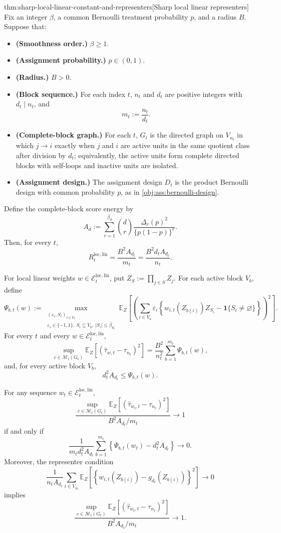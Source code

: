 \begin{theoremv}{thm:sharp-local-linear-constant-and-representers}[Sharp local linear representers]
Fix an integer \(\beta\), a common Bernoulli treatment probability \(p\), and a radius \(B\).  Suppose that:
\begin{itemize}
\item \textbf{(Smoothness order.)} \(\beta\ge 1\).
\item \textbf{(Assignment probability.)} \(p\in(0,1)\).
\item \textbf{(Radius.)} \(B>0\).
\item \textbf{(Block sequence.)} For each index \(t\), \(n_t\) and \(d_t\) are positive integers with \(d_t\mid n_t\), and
\[
m_t:=\frac{n_t}{d_t}.
\]
\item \textbf{(Complete-block graph.)} For each \(t\), \(G_t\) is the directed graph on \(V_{n_t}\) in which \(j\to i\) exactly when \(j\) and \(i\) are active units in the same quotient class after division by \(d_t\); equivalently, the active units form complete directed blocks with self-loops and inactive units are isolated.
\item \textbf{(Assignment design.)} The assignment design \(D_t\) is the product Bernoulli design with common probability \(p\), as in \cref{obj:ass:bernoulli-design}.
\end{itemize}
Define the complete-block score energy by
\[
A_d
:=
\sum_{r=1}^{\bar\beta_d}
\binom{d}{r}\frac{\Delta_r(p)^2}{\{p(1-p)\}^r}.
\]
Then, for every \(t\),
\[
R_t^{\mathrm{loc,lin}}
=
\frac{B^2A_{d_t}}{m_t}
=
\frac{B^2d_tA_{d_t}}{n_t}.
\]

For local linear weights \(w\in\mathcal E_t^{\mathrm{loc,lin}}\), put \(Z_S:=\prod_{j\in S}Z_j\).  For each active block \(V_b\), define
\[
\Psi_{b,t}(w)
:=
\max_{\substack{(\varepsilon_i,S_i)_{i\in V_b}\\
\varepsilon_i\in\{-1,1\},\ S_i\subseteq V_b,\ |S_i|\le \bar\beta_{d_t}}}
\mathbb E_Z\!\left[
\left(
\sum_{i\in V_b}
\varepsilon_i
\left\{
w_{i,t}(Z_{b(i)})Z_{S_i}
-
\mathbf 1\{S_i\ne\varnothing\}
\right\}
\right)^2
\right].
\]
For every \(t\) and every \(w\in\mathcal E_t^{\mathrm{loc,lin}}\),
\[
\sup_{c\in\mathcal M_t(G_t)}
\mathbb E_Z\!\left[(\widehat\tau_{w,t}-\tau_{n_t})^2\right]
=
\frac{B^2}{n_t^2}\sum_{b=1}^{m_t}\Psi_{b,t}(w),
\]
and, for every active block \(V_b\),
\[
d_t^2A_{d_t}\le \Psi_{b,t}(w).
\]

For any sequence \(w_t\in\mathcal E_t^{\mathrm{loc,lin}}\),
\[
\frac{
\sup_{c\in\mathcal M_t(G_t)}
\mathbb E_Z\!\left[(\widehat\tau_{w_t,t}-\tau_{n_t})^2\right]
}{
B^2A_{d_t}/m_t
}
\longrightarrow 1
\]
if and only if
\[
\frac{1}{m_td_t^2A_{d_t}}
\sum_{b=1}^{m_t}
\left\{\Psi_{b,t}(w_t)-d_t^2A_{d_t}\right\}
\longrightarrow 0.
\]
Moreover, the representer condition
\[
\frac{1}{n_tA_{d_t}}
\sum_{i\in V_{n_t}}
\mathbb E_Z\!\left[
\left\{
w_{i,t}(Z_{b(i)})-g_{d_t}(Z_{b(i)})
\right\}^2
\right]
\longrightarrow 0
\]
implies
\[
\frac{
\sup_{c\in\mathcal M_t(G_t)}
\mathbb E_Z\!\left[(\widehat\tau_{w_t,t}-\tau_{n_t})^2\right]
}{
B^2A_{d_t}/m_t
}
\longrightarrow 1.
\]


\end{theoremv}
